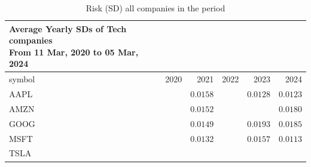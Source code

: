 \documentclass[
  12pt]{article}
\theoremstyle{definition}
\theoremstyle{remark}
\begin{document}
\begin{longtable}{lrrrrr}

\caption{\label{tbl-risk-all-companies}Risk (SD) all companies in the
period}

\tabularnewline

\caption*{
{\large Average Yearly SDs of Tech companies} \\ 
{\small From 11 Mar, 2020 to 05 Mar, 2024}
} \\ 
\toprule
symbol & 2020 & 2021 & 2022 & 2023 & 2024 \\ 
\midrule\addlinespace[2.5pt]
AAPL & \cellcolor[HTML]{FF0000}{\textcolor[HTML]{FFFFFF}{$0.0283$}} & $0.0158$ & \cellcolor[HTML]{FF0000}{\textcolor[HTML]{FFFFFF}{$0.0224$}} & $0.0128$ & $0.0123$ \\ 
AMZN & \cellcolor[HTML]{FF0000}{\textcolor[HTML]{FFFFFF}{$0.0237$}} & $0.0152$ & \cellcolor[HTML]{FF0000}{\textcolor[HTML]{FFFFFF}{$0.0316$}} & \cellcolor[HTML]{FF0000}{\textcolor[HTML]{FFFFFF}{$0.0207$}} & $0.0180$ \\ 
GOOG & \cellcolor[HTML]{FF0000}{\textcolor[HTML]{FFFFFF}{$0.0234$}} & $0.0149$ & \cellcolor[HTML]{FF0000}{\textcolor[HTML]{FFFFFF}{$0.0244$}} & $0.0193$ & $0.0185$ \\ 
MSFT & \cellcolor[HTML]{FF0000}{\textcolor[HTML]{FFFFFF}{$0.0268$}} & $0.0132$ & \cellcolor[HTML]{FF0000}{\textcolor[HTML]{FFFFFF}{$0.0223$}} & $0.0157$ & $0.0113$ \\ 
TSLA & \cellcolor[HTML]{FF0000}{\textcolor[HTML]{FFFFFF}{$0.0538$}} & \cellcolor[HTML]{FF0000}{\textcolor[HTML]{FFFFFF}{$0.0342$}} & \cellcolor[HTML]{FF0000}{\textcolor[HTML]{FFFFFF}{$0.0423$}} & \cellcolor[HTML]{FF0000}{\textcolor[HTML]{FFFFFF}{$0.0340$}} & \cellcolor[HTML]{FF0000}{\textcolor[HTML]{FFFFFF}{$0.0309$}} \\ 
\bottomrule

\end{longtable}


  
\end{document}
